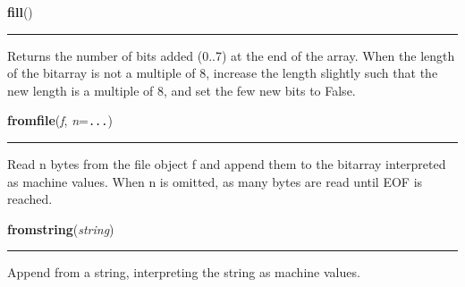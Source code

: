     \label{bitarray:_bitarray:fill}

    \vspace{0.5ex}

    \begin{boxedminipage}{\textwidth}

    \raggedright \textbf{fill}()

    \vspace{-1.5ex}

    \rule{\textwidth}{0.5\fboxrule}

Returns the number of bits added (0..7) at the end of the array.
When the length of the bitarray is not a multiple of 8, increase the length
slightly such that the new length is a multiple of 8, and set the few new
bits to False.
    \vspace{1ex}

    \end{boxedminipage}

    \label{bitarray:_bitarray:fromfile}

    \vspace{0.5ex}

    \begin{boxedminipage}{\textwidth}

    \raggedright \textbf{fromfile}(\textit{f}, \textit{n}=\texttt{...})

    \vspace{-1.5ex}

    \rule{\textwidth}{0.5\fboxrule}

Read n bytes from the file object f and append them to the bitarray
interpreted as machine values.  When n is omitted, as many bytes are
read until EOF is reached.
    \vspace{1ex}

    \end{boxedminipage}

    \label{bitarray:_bitarray:fromstring}

    \vspace{0.5ex}

    \begin{boxedminipage}{\textwidth}

    \raggedright \textbf{fromstring}(\textit{string})

    \vspace{-1.5ex}

    \rule{\textwidth}{0.5\fboxrule}

Append from a string, interpreting the string as machine values.
    \vspace{1ex}

    \end{boxedminipage}

